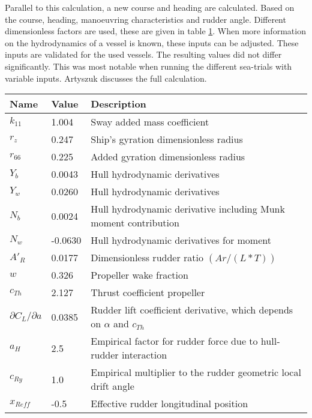Parallel to this calculation, a new course and heading are calculated. Based on the course, heading, manoeuvring characteristics and rudder angle. Different dimensionless factors are used, these are given in table \ref{tab:dimensionless-factors}. When more information on the hydrodynamics of a vessel is known, these inputs can be adjusted. These inputs are validated for the used vessels. The resulting values did not differ significantly. This was most notable when running the different sea-trials with variable inputs. Artyszuk \cite{Artyszuk2016} discusses the full calculation. 


\begin{table}[p]
	\centering
	\begin{tabular}{p{}|p{}|p{}}
		\toprule
		Name & Value & Description\\
		\midrule
		$k_{11}$ & 1.004 & Sway added mass coefficient \\
		$r_{z}$ & 0.247 & Ship's gyration dimensionless radius \\
		$r_{66}$ & 0.225 & Added gyration dimensionless radius \\
		$Y_{b}$ & 0.0043 & Hull hydrodynamic derivatives\\
		$Y_{w}$ & 0.0260 & Hull hydrodynamic derivatives\\
		$N_{b}$ & 0.0024 & Hull hydrodynamic derivative including Munk moment contribution \\
		$N_{w}$ & -0.0630 & Hull hydrodynamic derivatives for moment\\
		$A'_{R}$ & 0.0177 & Dimensionless rudder ratio $(Ar/(L*T))$ \\
		$w$ & 0.326 & Propeller wake fraction \\
		$c_{Th}$ & 2.127 & Thrust coefficient propeller \\
		$\partial C_{L} / \partial a$ & 0.0385 & Rudder lift coefficient derivative, which depends on $\alpha$ and $c_{Th}$ \\
		
		$a_{H}$ & 2.5 & Empirical factor for rudder force due to hull‐rudder interaction \\
		$c_{Ry}$ & 1.0 & Empirical multiplier to the rudder geometric local drift angle \\
		$x_{Reff}$ & -0.5 & Effective rudder longitudinal position \\
		\bottomrule
	\end{tabular}
	
	\label{tab:dimensionless-factors}
\end{table}

